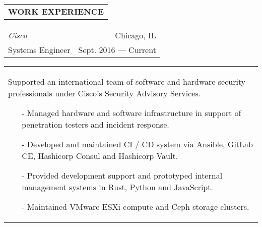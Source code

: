 \begin{tabularx}{\textwidth}{L}
    \textbf{WORK EXPERIENCE}
\end{tabularx}

\begin{tabularx}{\textwidth}{L R}
    \normalsize\textit{Cisco} & Chicago, IL \\
    Systems Engineer & Sept. 2016 --- Current \\
\end{tabularx}
\begin{tabularx}{\textwidth}{X}
    \vspace{1pt}
    Supported an international team of software and hardware security professionals under Cisco's Security Advisory Services.
    \begin{itemize}
        \itemsep{}
        \item[-] Managed hardware and software infrastructure in support of penetration testers and incident response.
        \item[-] Developed and maintained CI / CD system via Ansible, GitLab CE, Hashicorp Consul and Hashicorp Vault.
        \item[-] Provided development support and prototyped internal management systems in Rust, Python and JavaScript.
        \item[-] Maintained VMware ESXi compute and Ceph storage clusters.
    \end{itemize}
\end{tabularx}

